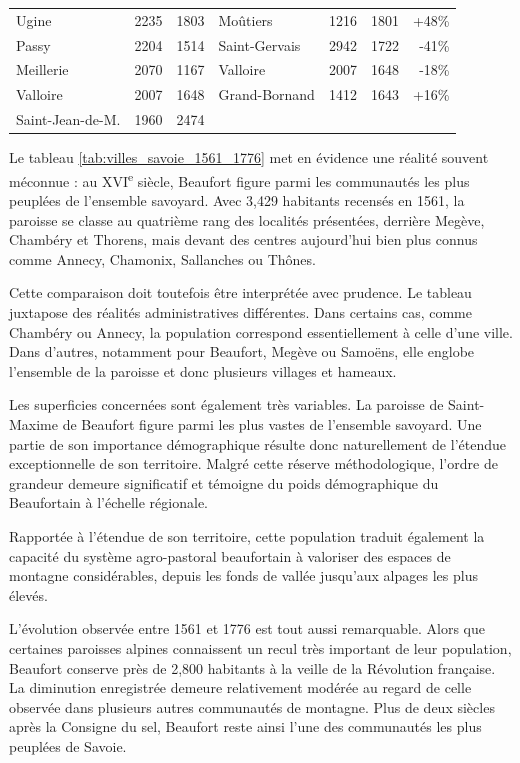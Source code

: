 \documentclass[12pt,a4paper]{report}
\begin{document}
\begin{table}[htbp]
{\begin{tabular}{lrr|lrrr}
			Ugine             & 2235   & 1803 & Moûtiers         & 1216   & 1801 & +48\% \\
			Passy             & 2204   & 1514 & Saint-Gervais    & 2942   & 1722 & -41\% \\
			Meillerie         & 2070   & 1167 & Valloire         & 2007   & 1648 & -18\% \\
			Valloire          & 2007   & 1648 & Grand-Bornand    & 1412   & 1643 & +16\% \\
			Saint-Jean-de-M.  & 1960   & 2474 &                  &        &      &      \\
			\bottomrule
		\end{tabular}
	}
\end{table}

Le tableau \ref{tab:villes_savoie_1561_1776} met en évidence une réalité souvent méconnue : au XVI\textsuperscript{e} siècle, Beaufort figure parmi les communautés les plus peuplées de l'ensemble savoyard. Avec 3,429 habitants recensés en 1561, la paroisse se classe au quatrième rang des localités présentées, derrière Megève, Chambéry et Thorens, mais devant des centres aujourd'hui bien plus connus comme Annecy, Chamonix, Sallanches ou Thônes.

Cette comparaison doit toutefois être interprétée avec prudence. Le tableau juxtapose des réalités administratives différentes. Dans certains cas, comme Chambéry ou Annecy, la population correspond essentiellement à celle d'une ville. Dans d'autres, notamment pour Beaufort, Megève ou Samoëns, elle englobe l'ensemble de la paroisse et donc plusieurs villages et hameaux.

Les superficies concernées sont également très variables. La paroisse de Saint-Maxime de Beaufort figure parmi les plus vastes de l'ensemble savoyard. Une partie de son importance démographique résulte donc naturellement de l'étendue exceptionnelle de son territoire. Malgré cette réserve méthodologique, l'ordre de grandeur demeure significatif et témoigne du poids démographique du Beaufortain à l'échelle régionale.

Rapportée à l'étendue de son territoire, cette population traduit également la capacité du système agro-pastoral beaufortain à valoriser des espaces de montagne considérables, depuis les fonds de vallée jusqu'aux alpages les plus élevés.



L'évolution observée entre 1561 et 1776 est tout aussi remarquable. Alors que certaines paroisses alpines connaissent un recul très important de leur population, Beaufort conserve près de 2,800 habitants à la veille de la Révolution française. La diminution enregistrée demeure relativement modérée au regard de celle observée dans plusieurs autres communautés de montagne. Plus de deux siècles après la Consigne du sel, Beaufort reste ainsi l'une des communautés les plus peuplées de Savoie.
\end{document}
